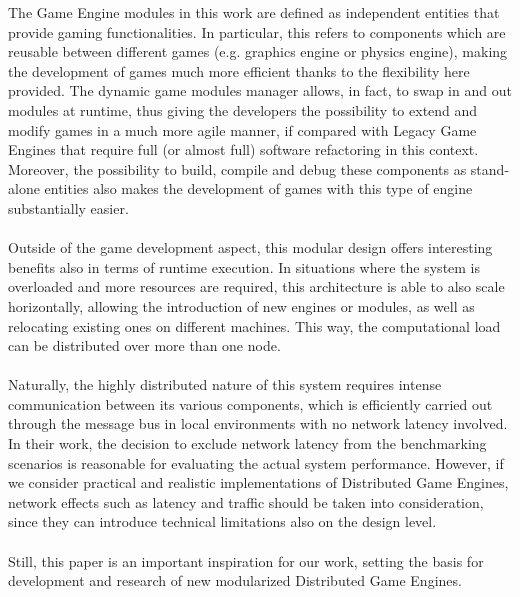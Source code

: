 The Game Engine modules in this work are defined as independent entities that provide gaming functionalities. In particular, this refers to components which are reusable between different games (e.g. graphics engine or physics engine), making the development of games much more efficient thanks to the flexibility here provided. The dynamic game modules manager allows, in fact, to swap in and out modules at runtime, thus giving the developers the possibility to extend and modify games in a much more agile manner, if compared with Legacy Game Engines that require full (or almost full) software refactoring in this context. \\
Moreover, the possibility to build, compile and debug these components as stand-alone entities also makes the development of games with this type of engine substantially easier. \\ \\
Outside of the game development aspect, this modular design offers interesting benefits also in terms of runtime execution. In situations where the system is overloaded and more resources are required, this architecture is able to also scale horizontally, allowing the introduction of new engines or modules, as well as relocating existing ones on different machines. This way, the computational load can be distributed over more than one node. \\ \\
Naturally, the highly distributed nature of this system requires intense communication between its various components, which is efficiently carried out through the message bus in local environments with no network latency involved. In their work, the decision to exclude network latency from the benchmarking scenarios is reasonable for evaluating the actual system performance. However, if we consider practical and realistic implementations of Distributed Game Engines, network effects such as latency and traffic should be taken into consideration, since they can introduce technical limitations also on the design level. \\ \\
Still, this paper is an important inspiration for our work, setting the basis for development and research of new modularized Distributed Game Engines.

